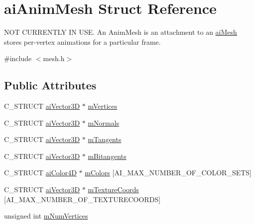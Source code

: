 \hypertarget{structai_anim_mesh}{\section{ai\-Anim\-Mesh Struct Reference}
\label{structai_anim_mesh}
}


N\-O\-T C\-U\-R\-R\-E\-N\-T\-L\-Y I\-N U\-S\-E. An Anim\-Mesh is an attachment to an \hyperlink{structai_mesh}{ai\-Mesh} stores per-\/vertex animations for a particular frame.  




{\ttfamily \#include $<$mesh.\-h$>$}

\subsection*{Public Attributes}
\begin{DoxyCompactItemize}
\item 
C\-\_\-\-S\-T\-R\-U\-C\-T \hyperlink{structai_vector3_d}{ai\-Vector3\-D} $\ast$ \hyperlink{structai_anim_mesh_a0ac2dd4c1afd23e6a9293b1d0ded3060}{m\-Vertices}
\item 
C\-\_\-\-S\-T\-R\-U\-C\-T \hyperlink{structai_vector3_d}{ai\-Vector3\-D} $\ast$ \hyperlink{structai_anim_mesh_a64a07a8c5c419b1e006c5302bca4d334}{m\-Normals}
\item 
C\-\_\-\-S\-T\-R\-U\-C\-T \hyperlink{structai_vector3_d}{ai\-Vector3\-D} $\ast$ \hyperlink{structai_anim_mesh_a95dcc49c6d5ecc570ceb54552a0a9625}{m\-Tangents}
\item 
C\-\_\-\-S\-T\-R\-U\-C\-T \hyperlink{structai_vector3_d}{ai\-Vector3\-D} $\ast$ \hyperlink{structai_anim_mesh_a7d60acf4d2b4b59dcc6c88956bfae85f}{m\-Bitangents}
\item 
C\-\_\-\-S\-T\-R\-U\-C\-T \hyperlink{structai_color4_d}{ai\-Color4\-D} $\ast$ \hyperlink{structai_anim_mesh_a4f062d9fac71c6b367fdf0f8638e1ca5}{m\-Colors} \mbox{[}A\-I\-\_\-\-M\-A\-X\-\_\-\-N\-U\-M\-B\-E\-R\-\_\-\-O\-F\-\_\-\-C\-O\-L\-O\-R\-\_\-\-S\-E\-T\-S\mbox{]}
\item 
C\-\_\-\-S\-T\-R\-U\-C\-T \hyperlink{structai_vector3_d}{ai\-Vector3\-D} $\ast$ \hyperlink{structai_anim_mesh_ad24a0451adeb845a53eb2351b9462e0a}{m\-Texture\-Coords} \mbox{[}A\-I\-\_\-\-M\-A\-X\-\_\-\-N\-U\-M\-B\-E\-R\-\_\-\-O\-F\-\_\-\-T\-E\-X\-T\-U\-R\-E\-C\-O\-O\-R\-D\-S\mbox{]}
\item 
unsigned int \hyperlink{structai_anim_mesh_a6bb0d45317a1bbea7f2b7f8191d0c436}{m\-Num\-Vertices}
\end{DoxyCompactItemize}


